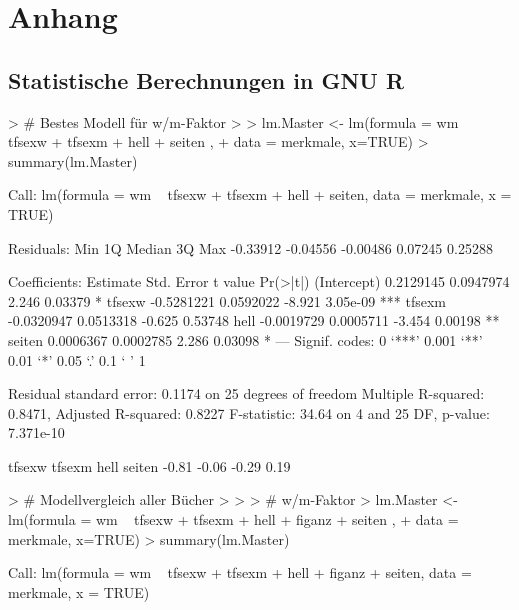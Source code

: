
\appendix
\chapter{Anhang}








\scriptsize


\section{Statistische Berechnungen in GNU R}

\begin{Schunk}
\begin{Sinput}
> # Bestes Modell für w/m-Faktor
> 
> lm.Master <- lm(formula = wm ~ tfsexw + tfsexm + hell +  seiten  , 
+   data = merkmale, x=TRUE)
> summary(lm.Master)
\end{Sinput}
\begin{Soutput}
Call:
lm(formula = wm ~ tfsexw + tfsexm + hell + seiten, data = merkmale, 
    x = TRUE)

Residuals:
     Min       1Q   Median       3Q      Max 
-0.33912 -0.04556 -0.00486  0.07245  0.25288 

Coefficients:
              Estimate Std. Error t value Pr(>|t|)    
(Intercept)  0.2129145  0.0947974   2.246  0.03379 *  
tfsexw      -0.5281221  0.0592022  -8.921 3.05e-09 ***
tfsexm      -0.0320947  0.0513318  -0.625  0.53748    
hell        -0.0019729  0.0005711  -3.454  0.00198 ** 
seiten       0.0006367  0.0002785   2.286  0.03098 *  
---
Signif. codes:  0 ‘***’ 0.001 ‘**’ 0.01 ‘*’ 0.05 ‘.’ 0.1 ‘ ’ 1 

Residual standard error: 0.1174 on 25 degrees of freedom
Multiple R-squared: 0.8471,	Adjusted R-squared: 0.8227 
F-statistic: 34.64 on 4 and 25 DF,  p-value: 7.371e-10 
\end{Soutput}
\begin{Soutput}
tfsexw tfsexm   hell seiten 
 -0.81  -0.06  -0.29   0.19 
\end{Soutput}
\begin{Sinput}
> # Modellvergleich aller Bücher
> 
> 
> # w/m-Faktor
> lm.Master <- lm(formula = wm ~ tfsexw + tfsexm + hell +  figanz  +  seiten  , 
+   data = merkmale, x=TRUE)
> summary(lm.Master)
\end{Sinput}
\begin{Soutput}
Call:
lm(formula = wm ~ tfsexw + tfsexm + hell + figanz + seiten, data = merkmale, 
    x = TRUE)


\end{Soutput}
\end{Schunk}

